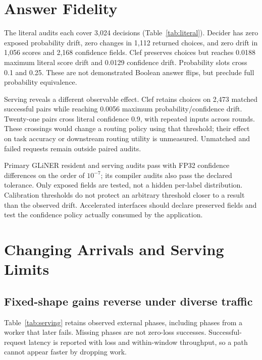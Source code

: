 \documentclass[10pt,twocolumn]{article}
\begin{document}
\section{Answer Fidelity}
The literal audits each cover 3,024 decisions (Table~\ref{tab:literal}). Decider has zero exposed probability drift, zero changes in 1,112 returned choices, and zero drift in 1,056 scores and 2,168 confidence fields. Clef preserves choices but reaches 0.0188 maximum literal score drift and 0.0129 confidence drift. Probability slots cross 0.1 and 0.25. These are not demonstrated Boolean answer flips, but preclude full probability equivalence.

\begin{table}[t]
\centering\small\setlength{\tabcolsep}{3pt}

\caption{Literal answer audit, one separate native-then-DFIP container per model. Probability drift covers 3,024 decisions, choice changes 1,112 categorical fields, and score drift 1,056 ordinal scores.}
\label{tab:literal}
\end{table}

Serving reveals a different observable effect. Clef retains choices on 2,473 matched successful pairs while reaching 0.0056 maximum probability/confidence drift. Twenty-one pairs cross literal confidence 0.9, with repeated inputs across rounds. These crossings would change a routing policy using that threshold; their effect on task accuracy or downstream routing utility is unmeasured. Unmatched and failed requests remain outside paired audits.

Primary GLiNER resident and serving audits pass with FP32 confidence differences on the order of $10^{-7}$; its compiler audits also pass the declared tolerance. Only exposed fields are tested, not a hidden per-label distribution. Calibration thresholds do not protect an arbitrary threshold closer to a result than the observed drift. Accelerated interfaces should declare preserved fields and test the confidence policy actually consumed by the application.

\section{Changing Arrivals and Serving Limits}
\subsection{Fixed-shape gains reverse under diverse traffic}
Table~\ref{tab:serving} retains observed external phases, including phases from a worker that later fails. Missing phases are not zero-loss successes. Successful-request latency is reported with loss and within-window throughput, so a path cannot appear faster by dropping work.
\end{document}
